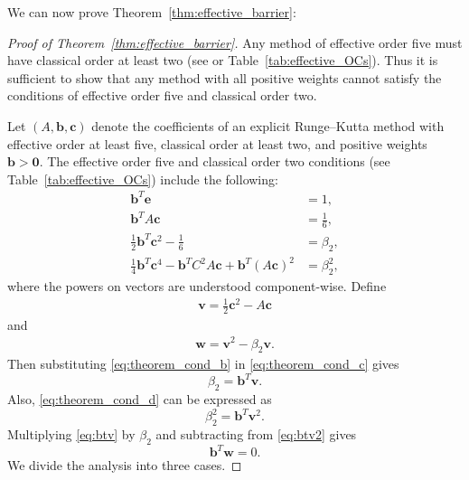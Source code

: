 We can now prove Theorem~\ref{thm:effective_barrier}:
\begin{proof}[Proof of Theorem~\ref{thm:effective_barrier}]
	Any method of effective order five must have classical order at least two
	(see \cite{Butcher2008_book} or Table~\ref{tab:effective_OCs}).
    Thus it is sufficient to show that any method with all positive weights
    cannot satisfy the conditions of effective order five and classical order two.

    Let $(A,\bm{b},\bm{c})$ denote the coefficients of an explicit Runge--Kutta method with
    effective order at least five, classical order at least two, and positive 
    weights $\bm{b} > \bm{0}$.
    The effective order five and classical order two conditions
    (see Table~\ref{tab:effective_OCs}) include the following:
    \begin{subequations}\label{eq:theorem_cond}
    		\begin{align}
    			\bm{b}^T\bm{e} & = 1, \label{eq:theorem_cond_a} \\
             	\bm{b}^TA\bm{c} &= \frac{1}{6}, \label{eq:theorem_cond_b} \\
            	\frac{1}{2}\bm{b}^T\bm{c}^2 - \frac{1}{6} &= \beta_2, \label{eq:theorem_cond_c} \\
            	\frac{1}{4}\bm{b}^T\bm{c}^4 - \bm{b}^TC^2A\bm{c} + \bm{b}^T(A\bm{c})^2 &= \beta_2^2, \label{eq:theorem_cond_d}
        	\end{align}
	\end{subequations}
	where the powers on vectors are understood component-wise. 
	Define
	\begin{align*} 
		\bm{v} = \frac{1}{2}\bm{c}^2 - A\bm{c}
	\end{align*}
	and
	\begin{align}\label{eq:def_w}
		\bm{w} = \bm{v}^{2} - \beta_{2}\bm{v}.
	\end{align}
	Then substituting \eqref{eq:theorem_cond_b} in \eqref{eq:theorem_cond_c} gives
	\begin{equation}\label{eq:btv}
		\beta_2 = \bm{b}^T\bm{v}.
	\end{equation}
	Also, \eqref{eq:theorem_cond_d} can be expressed as
	\begin{equation}\label{eq:btv2}
		\beta_2^2 = \bm{b}^T\bm{v}^2.
	\end{equation}
        Multiplying \eqref{eq:btv} by $\beta_2$ and subtracting
        from \eqref{eq:btv2} gives
	\begin{equation}\label{eq:btw}
		\bm{b}^T\bm{w} = 0.
	\end{equation}
        We divide the analysis into three cases.

\end{proof}

